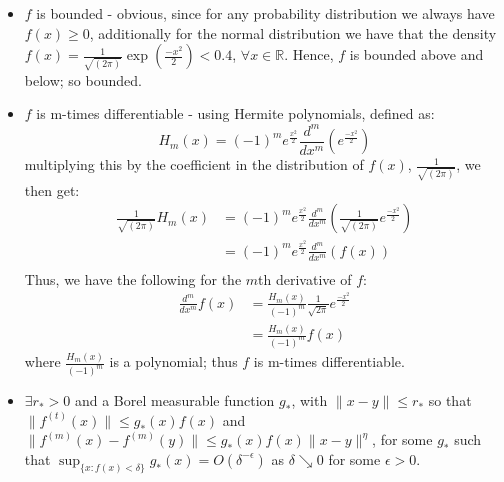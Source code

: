 \documentclass[12pt]{report}
\begin{document}
\begin{itemize}
\item $f$ is bounded - obvious, since for any probability distribution we always have $f(x) \geq 0$, additionally for the normal distribution we have that the density $f(x) = \frac{1}{\sqrt{(2\pi)}} \exp{ \left( \frac{-x^2}{2} \right)} < 0.4$, $\forall x \in \mathbb{R}$. Hence, $f$ is bounded above and below; so bounded.

\item $f$ is m-times differentiable - using Hermite polynomials, defined as:
\begin{equation}
H_{m}(x) = (-1)^m e^{\frac{x^2}{2}} \frac{d^m}{dx^m} \left(e^{\frac{-x^2}{2}} \right) \nonumber
\end{equation}
multiplying this by the coefficient in the distribution of $f(x)$, $\frac{1}{\sqrt{(2 \pi)}}$, we then get:
\begin{align*}
\frac{1}{\sqrt{(2 \pi)}} H_{m}(x) &= (-1)^m e^{\frac{x^2}{2}} \frac{d^m}{dx^m} \left(\frac{1}{\sqrt{(2 \pi)}} e^{\frac{-x^2}{2}} \right) \nonumber\\
&= (-1)^m e^{\frac{x^2}{2}} \frac{d^m}{dx^m} \left(f(x) \right) \nonumber\\
\end{align*}
Thus, we have the following for the $m$th derivative of $f$:
\begin{align*}
 \frac{d^m}{dx^m} f(x) &= \frac{H_{m}(x)}{(-1)^m} \frac{1}{\sqrt{2 \pi}} e^{\frac{-x^2}{2}} \\ 
&= \frac{H_{m}(x)}{(-1)^m} f(x) 
\end{align*}
where $\frac{H_{m}(x)}{(-1)^m}$ is a polynomial; thus $f$ is m-times differentiable.

\item $\exists r_{*} > 0$ and a Borel measurable function $g_{*}$, with $\|x-y\| \leq r_{*}$ so that $\|f^{(t)}(x)\| \leq g_{*}(x) f(x)$ and $\|f^{(m)}(x) - f^{(m)}(y)\| \leq g_{*}(x) f(x)\|x-y\|^{\eta}$, for some $g_{*}$ such that $\sup_{\{x : f(x) < \delta\}} g_{*}(x) = O(\delta^{-\epsilon})$ as $\delta \searrow 0$ for some $\epsilon >0$. 


\end{itemize}
\end{document}
